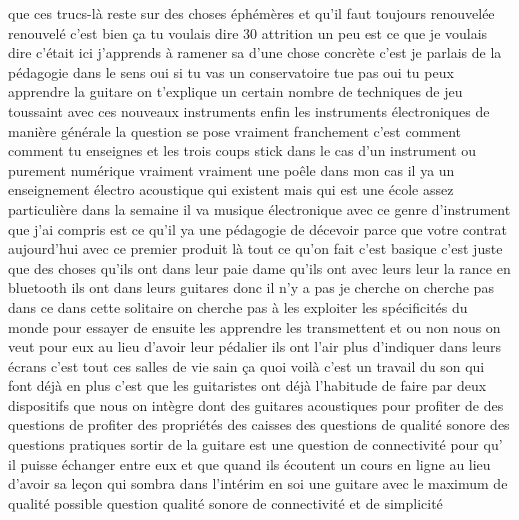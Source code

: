  que ces trucs-là reste sur des choses éphémères et qu'il faut toujours renouvelée renouvelé c'est bien ça tu voulais dire 30 attrition un peu est ce que je voulais dire c'était ici j'apprends à ramener sa d'une chose concrète c'est je parlais de la pédagogie dans le sens oui si tu vas un conservatoire tue pas oui tu peux apprendre la guitare on t'explique un certain nombre de techniques de jeu toussaint avec ces nouveaux instruments enfin les instruments électroniques de manière générale la question se pose vraiment franchement c'est comment comment tu enseignes et les trois coups stick dans le cas d'un instrument ou purement numérique vraiment vraiment une poêle dans mon cas il ya un enseignement électro acoustique qui existent mais qui est une école assez particulière dans la semaine il va musique électronique avec ce genre d'instrument que j'ai compris est ce qu'il ya une pédagogie de décevoir parce que votre contrat aujourd'hui avec ce premier produit là tout ce qu'on fait c'est basique c'est juste que des choses qu'ils ont dans leur paie dame qu'ils ont avec leurs leur la rance en bluetooth ils ont dans leurs guitares donc il n'y a pas je cherche on cherche pas dans ce dans cette solitaire on cherche pas à les exploiter les spécificités du monde pour essayer de ensuite les apprendre les transmettent et ou non nous on veut pour eux au lieu d'avoir leur pédalier ils ont l'air plus d'indiquer dans leurs écrans c'est tout ces salles de vie sain ça quoi voilà c'est un travail du son qui font déjà en plus c'est que les guitaristes ont déjà l'habitude de faire par deux dispositifs que nous on intègre dont des guitares acoustiques pour profiter de des questions de profiter des propriétés des caisses des questions de qualité sonore des questions pratiques sortir de la guitare est une question de connectivité pour qu' il puisse échanger entre eux et que quand ils écoutent un cours en ligne au lieu d'avoir sa leçon qui sombra dans l'intérim en soi une guitare avec le maximum de qualité possible question qualité sonore de connectivité et de simplicité 
